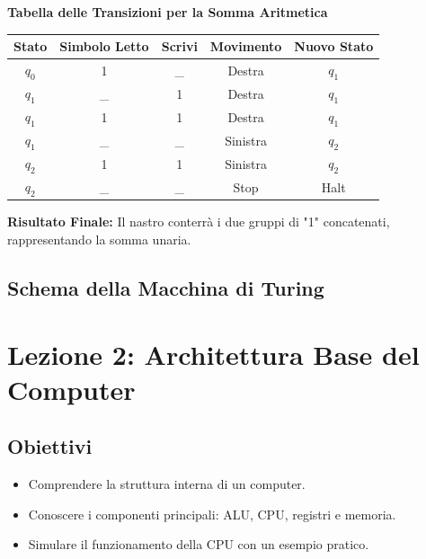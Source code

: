 \documentclass[a4paper,12pt]{report}
\begin{document}
\textbf{Tabella delle Transizioni per la Somma Aritmetica}
\begin{center}
\begin{tabular}{|c|c|c|c|c|}
    \hline
    Stato & Simbolo Letto & Scrivi & Movimento & Nuovo Stato \\
    \hline
    $q_0$ & 1 & \_ & Destra & $q_1$ \\
    $q_1$ & \_ & 1 & Destra & $q_1$ \\
    $q_1$ & 1 & 1 & Destra & $q_1$ \\
    $q_1$ & \_ & \_ & Sinistra & $q_2$ \\
    $q_2$ & 1 & 1 & Sinistra & $q_2$ \\
    $q_2$ & \_ & \_ & Stop & Halt \\
    \hline
\end{tabular}
\end{center}

\textbf{Risultato Finale:} Il nastro conterr\`a i due gruppi di "1" concatenati, rappresentando la somma unaria.

\subsection*{Schema della Macchina di Turing}
\begin{center}
\end{center}

\newpage
\section*{Lezione 2: Architettura Base del Computer}
\subsection*{Obiettivi}
\begin{itemize}
    \item Comprendere la struttura interna di un computer.
    \item Conoscere i componenti principali: ALU, CPU, registri e memoria.
    \item Simulare il funzionamento della CPU con un esempio pratico.
\end{itemize}
\end{document}
